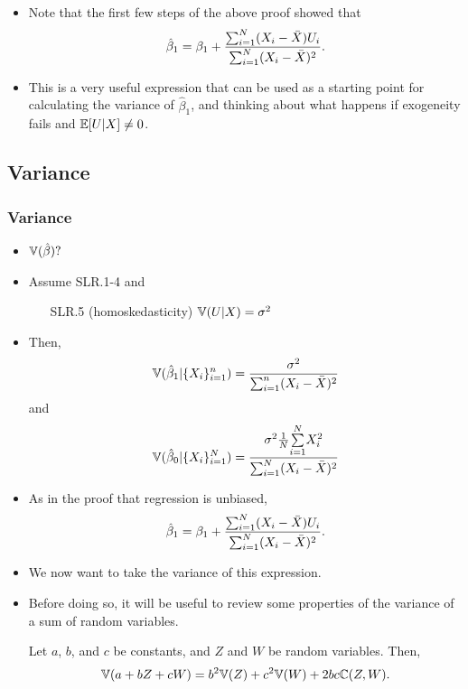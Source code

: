 \begin{frame}
\begin{itemize}
\item Note that the first few steps of the above proof showed that 
\begin{align*}
  \hat{\beta}_1 = \beta_1 + \frac{{\sum_{i=1}^N} (X_i - \bar{X})
U_i}{{\sum_{i=1}^N} (X_i - \bar{X})^2}. 
\end{align*}

\item This is a very useful expression that can be used as a starting point
for calculating the variance of $\hat{\beta}_1$, and thinking about
what happens if exogeneity fails and $\mathbb{E}[U|X] \neq 0$.
\end{itemize}
\end{frame}



\subsection{Variance}

\begin{frame}[allowframebreaks]
  \frametitle{Variance}
  \begin{itemize}
  \item $\mathbb{V}(\hat{\beta})?$
  \item Assume SLR.1-4 and
    \begin{enumerate}
    \item[SLR.5]\label{s5} (homoskedasticity) $\mathbb{V}(U | X) =
      \sigma^2$
    \end{enumerate}
  \item Then, 
    \[ \mathbb{V}(\hat{\beta}_1 | \{X_i\}_{i=1}^n ) =
    \frac{\sigma^2}{\sum_{i=1}^n (X_i - \bar{X})^2} \]
    and 
    \[ \mathbb{V}(\hat{\beta}_0 | \{X_i\}_{i=1}^N ) =
    \frac{\sigma^2 \frac{1}{N} \underset{i=1}{\overset{N}{\sum}} X_i^2 }{\sum_{i=1}^N (X_i - \bar{X})^2} \]
  
\framebreak

\item As in the proof that regression is unbiased, 
\begin{align*}
  \hat{\beta}_1 = \beta_1 + \frac{{\sum_{i=1}^N} (X_i - \bar{X})
    U_i}{{\sum_{i=1}^N} (X_i - \bar{X})^2}. 
\end{align*}
\item We now want to take the variance of this expression. 

\item Before doing so,
it will be useful to review some properties of the variance of a sum
of random variables. 
\begin{lemma}
  Let $a$, $b$, and $c$ be constants, and $Z$ and $W$ be random
  variables. Then,
  \[ \mathbb{V}(a + bZ + cW) = b^2 \mathbb{V}(Z) + c^2 \mathbb{V}(W) + 2 bc
  \mathbb{C}(Z,W). \]
\end{lemma}

\end{itemize}
\end{frame}

